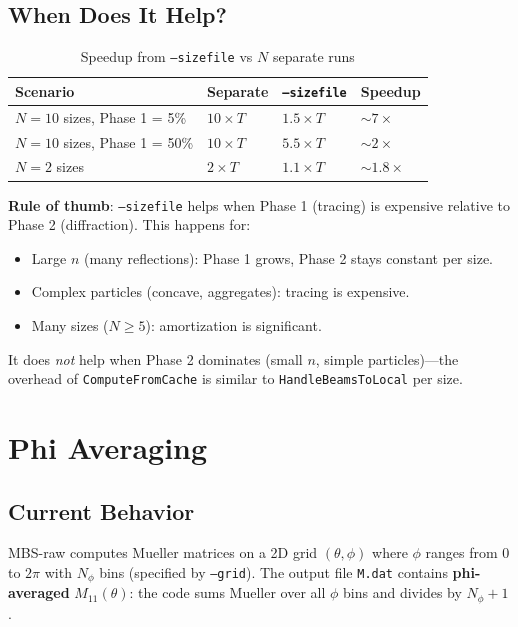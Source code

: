 \documentclass[11pt,a4paper]{article}
\begin{document}
\subsection{When Does It Help?}

\begin{table}[h]\centering
\caption{Speedup from \texttt{--sizefile} vs $N$ separate runs}
\begin{tabular}{llll}
\toprule
Scenario & Separate & \texttt{--sizefile} & Speedup \\
\midrule
$N{=}10$ sizes, Phase 1 = 5\% & $10 \times T$ & $1.5 \times T$ & $\sim 7\times$ \\
$N{=}10$ sizes, Phase 1 = 50\% & $10 \times T$ & $5.5 \times T$ & $\sim 2\times$ \\
$N{=}2$ sizes & $2 \times T$  & $1.1 \times T$ & $\sim 1.8\times$ \\
\bottomrule
\end{tabular}
\end{table}

\textbf{Rule of thumb}: \texttt{--sizefile} helps when Phase 1 (tracing) is expensive relative to
Phase 2 (diffraction). This happens for:
\begin{itemize}
\item Large $n$ (many reflections): Phase 1 grows, Phase 2 stays constant per size.
\item Complex particles (concave, aggregates): tracing is expensive.
\item Many sizes ($N \geq 5$): amortization is significant.
\end{itemize}

It does \emph{not} help when Phase 2 dominates (small $n$, simple particles)—the overhead
of \texttt{ComputeFromCache} is similar to \texttt{HandleBeamsToLocal} per size.

\section{Phi Averaging}

\subsection{Current Behavior}

MBS-raw computes Mueller matrices on a 2D grid $(\theta, \phi)$ where $\phi$ ranges from 0 to
$2\pi$ with $N_\phi$ bins (specified by \texttt{--grid}). The output file \texttt{M.dat} contains
\textbf{phi-averaged} $M_{11}(\theta)$: the code sums Mueller over all $\phi$ bins and divides by $N_\phi+1$.
\end{document}
